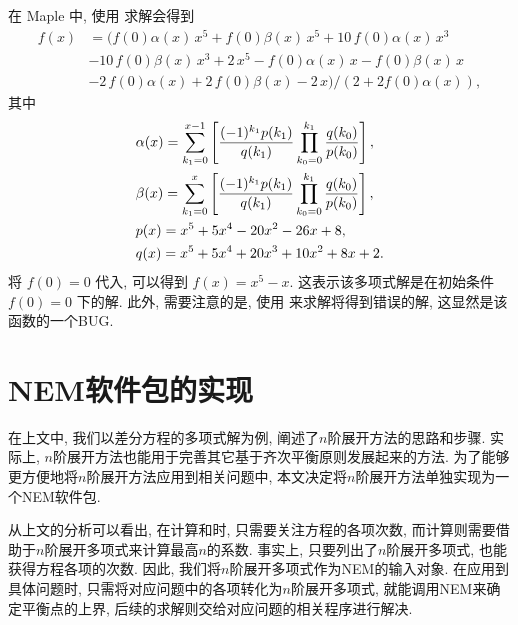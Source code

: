 \begin{example}
在 Maple 中, 使用  求解会得到
\begin{equation}
\begin{split}
    f(x)&=(f \left( 0 \right) \alpha(x)\,{x}^{5}+f \left( 0 \right) \beta(x)\,{x}^{5}+10\,f \left( 0 \right) \alpha(x)\,{x}^{3}\\
    &-10\,f \left( 0 \right) \beta(x)\,{x}^{3}+2\,{x}^{5}-f \left( 0 \right) \alpha(x)\,x-f \left( 0 \right) \beta(x)\,x\\
    &-2\,f \left( 0 \right) \alpha(x)+2\,f \left( 0 \right) \beta(x)-2\,x)/(2+2f(0)\alpha(x)) ,
\end{split} \label{rasol_real}
\end{equation}
其中
\begin{equation}
\begin{split}
&\alpha(x)=\sum_{k_1=0}^{x-1}\left[
    \frac{(-1)^{k_1}p(k_1)}{q(k_1)}\prod_{k_0=0}^{k_1}{
        \frac{q(k_0)}{p(k_0)}
    }
\right], \\
&\beta(x)=\sum_{k_1=0}^{x}\left[
    \frac{(-1)^{k_1}p(k_1)}{q(k_1)}\prod_{k_0=0}^{k_1}{
        \frac{q(k_0)}{p(k_0)}
    }
\right], \\
&p(x)=x^5+5x^4-20x^2-26x+8, \\
&q(x)=x^5+5x^4+20x^3+10x^2+8x+2. 
\end{split}
\end{equation}
将 $f(0)=0$ 代入, 可以得到 $f(x)=x^5-x$. 这表示该多项式解是在初始条件 $f(0)=0$ 下的解. 此外, 需要注意的是, 使用  来求解将得到错误的解, 这显然是该函数的一个BUG. 
\end{example}

\section{NEM软件包的实现}\label{ch4sec3}
在上文中, 我们以差分方程的多项式解为例, 阐述了$n$阶展开方法的思路和步骤. 实际上, $n$阶展开方法也能用于完善其它基于齐次平衡原则发展起来的方法. 为了能够更方便地将$n$阶展开方法应用到相关问题中, 本文决定将$n$阶展开方法单独实现为一个NEM软件包.

从上文的分析可以看出, 在计算\BPone{}和\BPtwo{}时, 只需要关注方程的各项次数, 而计算\BPthree{}则需要借助于$n$阶展开多项式来计算最高$n$的系数. 事实上, 只要列出了$n$阶展开多项式, 也能获得方程各项的次数. 因此, 我们将$n$阶展开多项式作为NEM的输入对象. 在应用到具体问题时, 只需将对应问题中的各项转化为$n$阶展开多项式, 就能调用NEM来确定平衡点的上界, 后续的求解则交给对应问题的相关程序进行解决. 

